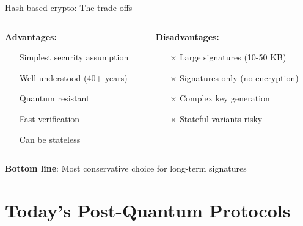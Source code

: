 \documentclass[aspectratio=169, lualatex, handout]{beamer}
\begin{document}
\begin{frame}{Hash-based crypto: The trade-offs}
	\begin{columns}[c]
		\begin{column}{0.5\textwidth}
			\textbf{Advantages:}
			\begin{itemize}
				\item[\mycheckmark] Simplest security assumption
				\item[\mycheckmark] Well-understood (40+ years)
				\item[\mycheckmark] Quantum resistant
				\item[\mycheckmark] Fast verification
				\item[\mycheckmark] Can be stateless
			\end{itemize}
		\end{column}
		\begin{column}{0.5\textwidth}
			\textbf{Disadvantages:}
			\begin{itemize}
				\item[$\times$] Large signatures (10-50 KB)
				\item[$\times$] Signatures only (no encryption)
				\item[$\times$] Complex key generation
				\item[$\times$] Stateful variants risky
			\end{itemize}
		\end{column}
	\end{columns}
	\vspace{5mm}
	\begin{center}
		\textbf{Bottom line}: Most conservative choice for long-term signatures
	\end{center}
\end{frame}

\section{Today's Post-Quantum Protocols}
\end{document}
